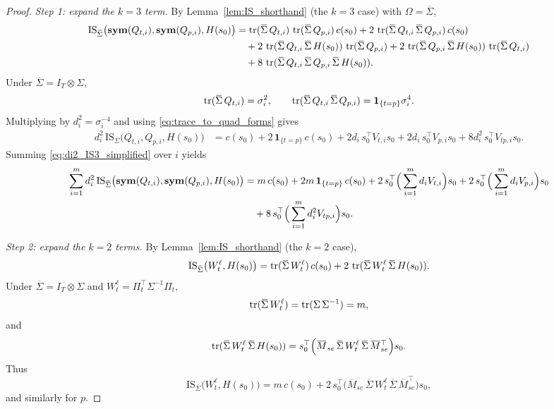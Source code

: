 \begin{proof}
\emph{Step 1: expand the $k=3$ term.}
By Lemma~\ref{lem:IS_shorthand} (the $k=3$ case) with $\Omega=\overline\Sigma$,
\begin{align}
\mathrm{IS}_{\overline\Sigma} \big(\symfun(Q_{t,i}),\symfun(Q_{p,i}),H(s_0)\big)
&=\tr(\overline\Sigma\,Q_{t,i})\,\tr(\overline\Sigma\,Q_{p,i})\,c(s_0)
+2\,\tr(\overline\Sigma\,Q_{t,i}\,\overline\Sigma\,Q_{p,i})\,c(s_0)\notag\\
&\quad
+2\,\tr(\overline\Sigma\,Q_{t,i}\,\overline\Sigma\,H(s_0))\,\tr(\overline\Sigma\,Q_{p,i})
+2\,\tr(\overline\Sigma\,Q_{p,i}\,\overline\Sigma\,H(s_0))\,\tr(\overline\Sigma\,Q_{t,i})\notag\\
&\quad
+8\,\tr(\overline\Sigma\,Q_{t,i}\,\overline\Sigma\,Q_{p,i}\,\overline\Sigma\,H(s_0)).
\label{eq:IS3_QQH_expand}
\end{align}
Under $\overline\Sigma=I_T\otimes\Sigma$,
\[
\tr(\overline\Sigma\,Q_{t,i})=\sigma_i^2,\qquad
\tr(\overline\Sigma\,Q_{t,i}\,\overline\Sigma\,Q_{p,i})=\mathbf 1_{\{t=p\}}\sigma_i^4.
\]
Multiplying by $d_i^2=\sigma_i^{-4}$ and using \eqref{eq:trace_to_quad_forms} gives
\begin{align}
d_i^2\,\mathrm{IS}_{\overline\Sigma} \big(Q_{t,i},Q_{p,i},H(s_0)\big)
&=c(s_0)+2\,\mathbf 1_{\{t=p\}}\,c(s_0)
+2d_i\,s_0^\top V_{t,i}s_0
+2d_i\,s_0^\top V_{p,i}s_0
+8d_i^2\,s_0^\top V_{tp,i}s_0.
\label{eq:di2_IS3_simplified}
\end{align}
Summing \eqref{eq:di2_IS3_simplified} over $i$ yields
\begin{align}
\sum_{i=1}^m d_i^2\,\mathrm{IS}_{\overline\Sigma} \big(\symfun(Q_{t,i}),\symfun(Q_{p,i}),H(s_0)\big)
&= m\,c(s_0)+2m\,\mathbf 1_{\{t=p\}}\,c(s_0)
+2\,s_0^\top\Big(\sum_{i=1}^m d_i V_{t,i}\Big)s_0
+2\,s_0^\top\Big(\sum_{i=1}^m d_i V_{p,i}\Big)s_0\notag\\
&\quad
+8\,s_0^\top\Big(\sum_{i=1}^m d_i^2 V_{tp,i}\Big)s_0.
\label{eq:sum_di2_IS3}
\end{align}

\emph{Step 2: expand the $k=2$ terms.}
By Lemma~\ref{lem:IS_shorthand} (the $k=2$ case),
\begin{equation}\label{eq:IS2_WH}
\mathrm{IS}_{\overline\Sigma} \big(W^\ell_t,H(s_0)\big)
=\tr(\overline\Sigma\,W^\ell_t)\,c(s_0)+2\,\tr(\overline\Sigma\,W^\ell_t\,\overline\Sigma\,H(s_0)).
\end{equation}
Under $\overline\Sigma=I_T\otimes\Sigma$ and $W^\ell_t=\Pi_t^\top\Sigma^{-1}\Pi_t$,
\[
\tr(\overline\Sigma\,W^\ell_t)=\tr(\Sigma\,\Sigma^{-1})=m,
\]
and
\begin{equation}\label{eq:trace_WtH_to_quad}
\tr(\overline\Sigma\,W^\ell_t\,\overline\Sigma\,H(s_0))
=s_0^\top\Big(\overline M_{se}\,\overline\Sigma\,W^\ell_t\,\overline\Sigma\,\overline M_{se}^\top\Big)s_0.
\end{equation}
Thus
\begin{equation}\label{eq:IS2_WH_simplified}
\mathrm{IS}_{\overline\Sigma} \big(W^\ell_t,H(s_0)\big)
=m\,c(s_0)+2\,s_0^\top\Big(\overline M_{se}\,\overline\Sigma\,W^\ell_t\,\overline\Sigma\,\overline M_{se}^\top\Big)s_0,
\end{equation}
and similarly for $p$.


\end{proof}
